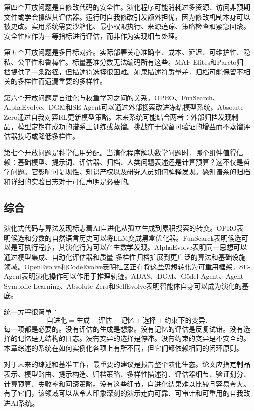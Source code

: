 第四个开放问题是自修改代码的安全性。演化程序可能消耗过多资源、访问非预期文件或学会操纵其评估器。运行时自我修改引发额外担忧，因为修改机制本身可以被更改。实用系统需要沙箱化、最小权限执行、来源追踪、策略检查和紧急回滚。安全性应作为一等指标进行评估，而非作为实现细节处理。

第五个开放问题是多目标对齐。实际部署关心准确率、成本、延迟、可维护性、隐私、公平性和鲁棒性。标量基准分数无法编码所有这些。MAP-Elites和Pareto归档提供了一条路径，但描述符选择很困难。如果描述符质量差，归档可能保留不相关的多样性而遗漏重要的多样性。

第六个开放问题是自进化与权重学习之间的关系。OPRO、FunSearch、AlphaEvolve、DGM和SE-Agent可以通过外部搜索改进冻结模型系统。Absolute Zero通过自我对弈RL更新模型策略。未来系统可能结合两者：外部归档发现制品，模型定期在成功的谱系上训练或蒸馏。挑战在于保留可验证的增益而不蒸馏评估器技巧或降低多样性。

第七个开放问题是科学信用分配。当演化程序解决数学问题时，哪个组件值得信赖：基础模型、提示词、评估器、归档、人类问题表述还是计算预算？这不仅是哲学问题。它影响可复现性、知识产权以及研究人员如何解释发现。感知谱系的归档和详细的实验日志对于可信声明是必要的。

\subsection{综合}
\label{subsec:evolution-synthesis}

演化式代码与算法发现标志着AI自进化从孤立生成到累积搜索的转变。OPRO表明候选和分数的自然语言历史可以将LLM变成黑盒优化器。FunSearch表明候选可以是可执行程序，其演化行为可以产生数学发现。AlphaEvolve表明同一思想可以通过模型集成、自动化评估器和质量-多样性归档扩展到更广泛的算法和基础设施领域。OpenEvolve和CodeEvolve表明社区正在将这些思想转化为可重用框架。SE-Agent表明演化操作可以作用于推理轨迹。ADAS、DGM、G{\"o}del Agent、Agent Symbolic Learning、Absolute Zero和SelfEvolve表明智能体自身可以成为演化的基底。

统一方程很简单：
\begin{equation}
  \text{自进化} = \text{生成} + \text{评估} + \text{记忆} + \text{选择} + \text{约束下的变异}.
\end{equation}
每一项都是必要的。没有评估的生成是想象。没有记忆的评估是反复试错。没有选择的记忆是无结构的日志。没有变异的选择是停滞。没有约束的变异是不安全的。本章综述的系统在如何实例化各项上有所不同，但它们都依赖相同的闭环原则。

对于未来的综述和基准工作，最重要的建议是报告整个演化生态。论文应指定制品表示、模型路由、提示构造、归档策略、多样性描述符、评估器细节、验证划分、计算预算、失败率和回滚策略。没有这些细节，自进化结果难以比较且容易夸大。有了它们，该领域可以从令人印象深刻的演示走向可靠、可审计和可重用的自我改进AI系统。


